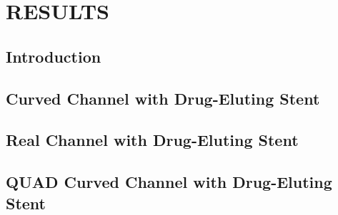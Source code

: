 \chapter{\textbf{RESULTS}}
\label{resultados}

\section{\textbf{Introduction}} 


%

\section{\textbf{Curved Channel with Drug-Eluting Stent}} 
\label{canal curvado com stent}


%

\section{\textbf{Real Channel with Drug-Eluting Stent}} 
\label{canal real com stent}


\section{\textbf{QUAD Curved Channel with Drug-Eluting Stent}} 
\label{quad canal curvado com stent}





%

